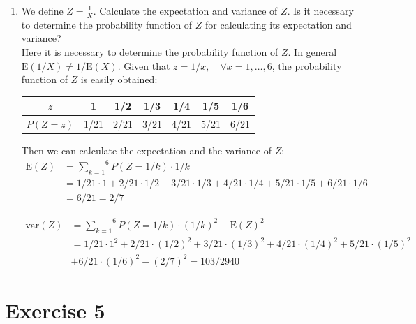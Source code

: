 \documentclass[12pt,thmsa]{article}\usepackage[]{graphicx}\usepackage[]{color}
\begin{document}
\begin{enumerate}
\item We define $Z = \frac{1}{X}$. Calculate the expectation and variance of $Z$. Is it necessary to determine the probability function of $Z$ for calculating its expectation and variance?\\

Here it is necessary to determine the probability function of $ Z $. In general $\mbox{E}(1/X) \neq 1/\mbox{E}(X)$. Given that $z=1/x, \quad \forall x=1,\ldots,6$, the probability function of $ Z $ is easily obtained:

			\begin{center}
			\begin{tabular}{|c|c|c|c|c|c|c|}
			\hline
			$z$ & 1 & 1/2 & 1/3 & 1/4 & 1/5 & 1/6 \\
			\hline
			$P(Z=z)$ & 1/21 & 2/21 & 3/21 & 4/21 & 5/21 & 6/21\\
			\hline
			\end{tabular}
			\end{center}

Then we can calculate the expectation and the variance of $ Z $:
\begin{equation*}
\begin{split}
\mbox{E}(Z) & = \overset{6}{\underset{k=1}{\sum}}P(Z=1/k)\cdot 1/k \\
& = 1/21\cdot1 + 2/21\cdot 1/2 + 3/21\cdot 1/3+4/21 \cdot 1/4 +5/21 \cdot 1/5+6/21 \cdot 1/6 \\&= 6/21 =2/7
\end{split}
\end{equation*}

\begin{equation*}
\begin{split}
\mbox{var}(Z) & = \overset{6}{\underset{k=1}{\sum}}P(Z=1/k)\cdot (1/k)^2 -\mbox{E}(Z)^2  \\
& = 1/21\cdot 1^2 + 2/21\cdot (1/2)^2 + 3/21\cdot (1/3)^2+4/21 \cdot (1/4)^2 +5/21 \cdot (1/5)^2\\&+6/21 \cdot (1/6)^2 -(2/7)^2  = 103/2940
\end{split}
\end{equation*}
\end{enumerate}


\section*{Exercise 5} %
\end{document}
